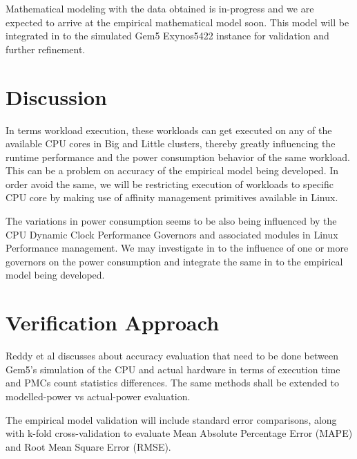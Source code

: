 \documentclass[conference]{IEEEtran}
\begin{document}
    \par Mathematical modeling with the data obtained is in-progress and we are expected to arrive at the empirical mathematical model soon. This model will be integrated in to the simulated Gem5 Exynos5422 instance for validation and further refinement.
    \medbreak
\section{Discussion}
    \par In terms workload execution, these workloads can get executed on any of the available CPU cores in Big and Little clusters, thereby greatly influencing the runtime performance and the power consumption behavior of the same workload. This can be a problem on accuracy of the empirical model being developed. In order avoid the same, we will be restricting execution of workloads to specific CPU core by making use of affinity management primitives available in Linux.

    \par The variations in power consumption seems to be also being influenced by the CPU Dynamic Clock Performance Governors \cite{10.1145/3167132.3167198} and associated modules in Linux Performance management. We may investigate in to the influence of one or more governors on the power consumption and integrate the same in to the empirical model being developed.
    \medbreak

\section{Verification Approach}
    \par Reddy et al \cite{Reddy2017EmpiricalCP} discusses about accuracy evaluation that need to be done between Gem5's simulation of the CPU and actual hardware in terms of execution time and PMCs count statistics differences. The same methods shall be extended to modelled-power vs actual-power evaluation. \par The empirical model validation will include standard error comparisons, along with k-fold cross-validation to evaluate Mean Absolute Percentage Error (MAPE) and Root Mean Square Error (RMSE).
    
\end{document}
